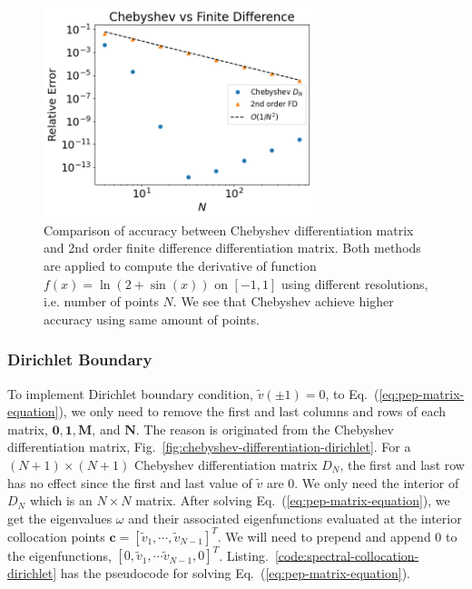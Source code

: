 \begin{figure}
	\centering
	\includegraphics[width=0.7\textwidth]{figures/chebyshev-vs-fd.png}
	\caption{Comparison of accuracy between Chebyshev differentiation matrix and 2nd order finite difference differentiation matrix. Both methods are applied to compute the derivative of function $f(x)=\ln(2+\sin(x))$ on $[-1,1]$ using different resolutions, i.e. number of points $N$. We see that Chebyshev achieve higher accuracy using same amount of points.}
	\label{fig:chebyshev-vs-fd}
\end{figure}

\subsubsection*{Dirichlet Boundary}
To implement Dirichlet boundary condition, $\tilde{v}(\pm 1)=0$, to Eq.~(\ref{eq:pep-matrix-equation}), we only need to remove the first and last columns and rows of each matrix, $\mathbf{0,1,M}$, and $\mathbf{N}$. The reason is originated from the Chebyshev differentiation matrix, Fig.~\ref{fig:chebyshev-differentiation-dirichlet}. For a $(N+1)\times(N+1)$ Chebyshev differentiation matrix $D_N$, the first and last row has no effect since the first and last value of $\tilde{v}$ are $0$. We only need the interior of $D_N$ which is an $N\times N$ matrix. After solving Eq.~(\ref{eq:pep-matrix-equation}), we get the eigenvalues $\omega$ and their associated eigenfunctions evaluated at the interior collocation points $\mathbf{c} = [\tilde{v}_1,\cdots,\tilde{v}_{N-1}]^T$. We will need to prepend and append 0 to the eigenfunctions, $[0, \tilde{v}_1,\cdots\tilde{v}_{N-1}, 0]^T$. Listing.~\ref{code:spectral-collocation-dirichlet} has the pseudocode for solving Eq.~(\ref{eq:pep-matrix-equation}).

